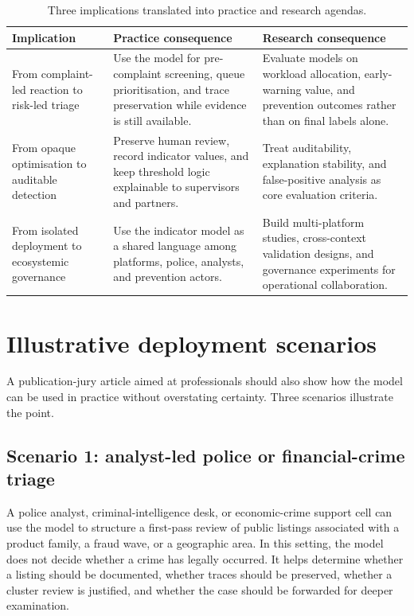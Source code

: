 \documentclass[11pt,a4paper]{article}
\begin{document}
\begin{table}[H]
\centering
\caption{Three implications translated into practice and research agendas.}
\begin{tabularx}{\textwidth}{p{3.4cm} Y Y}
\toprule
\textbf{Implication} & \textbf{Practice consequence} & \textbf{Research consequence} \\
\midrule
From complaint-led reaction to risk-led triage & Use the model for pre-complaint screening, queue prioritisation, and trace preservation while evidence is still available. & Evaluate models on workload allocation, early-warning value, and prevention outcomes rather than on final labels alone. \\
From opaque optimisation to auditable detection & Preserve human review, record indicator values, and keep threshold logic explainable to supervisors and partners. & Treat auditability, explanation stability, and false-positive analysis as core evaluation criteria. \\
From isolated deployment to ecosystemic governance & Use the indicator model as a shared language among platforms, police, analysts, and prevention actors. & Build multi-platform studies, cross-context validation designs, and governance experiments for operational collaboration. \\
\bottomrule
\end{tabularx}
\end{table}


\section{Illustrative deployment scenarios}
A publication-jury article aimed at professionals should also show how the model can be used in practice without overstating certainty. Three scenarios illustrate the point.

\subsection{Scenario 1: analyst-led police or financial-crime triage}
A police analyst, criminal-intelligence desk, or economic-crime support cell can use the model to structure a first-pass review of public listings associated with a product family, a fraud wave, or a geographic area. In this setting, the model does not decide whether a crime has legally occurred. It helps determine whether a listing should be documented, whether traces should be preserved, whether a cluster review is justified, and whether the case should be forwarded for deeper examination.
\end{document}
